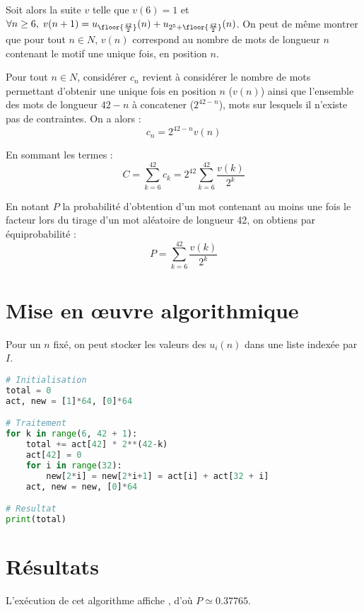 \documentclass{hibiscus}
\begin{document}
\par \medskip Soit alors la suite $v$ telle que $v(6) = 1$ et $\forall n \geq 6, \; v(n+1) = u_{\floor{\frac{42}{2}}}(n) + u_{2^5 + \floor{\frac{42}{2}}}(n)$. On peut de même montrer que pour tout $n \in N$, $v(n)$ correspond au nombre de mots de longueur $n$ contenant le motif  une unique fois, en position $n$. 

\par \medskip Pour tout $n \in N$, considérer $c_n$ revient à considérer le nombre de mots permettant d'obtenir  une unique fois en position $n$ ($v(n)$) ainsi que l'ensemble des mots de longueur $42 - n$ à concatener ($2^{42 - n}$), mots sur lesquels il n'existe pas de contraintes. On a alors : $$ c_n = 2^{42 - n} v(n) $$

\par \medskip En sommant les termes : $$ C = \sum_{k = 6}^{42}{c_k} = 2^{42} \sum_{k = 6}^{42}{\frac{v(k)}{2^k}} $$

\par \medskip En notant $P$ la probabilité d'obtention d'un mot contenant au moins une fois le facteur  lors du tirage d'un mot aléatoire de longueur 42, on obtiens par équiprobabilité : $$ P = \sum_{k = 6}^{42}{\frac{v(k)}{2^k}} $$

\section{Mise en \oe uvre algorithmique}

Pour un $n$ fixé, on peut stocker les valeurs des $u_i(n)$ dans une liste indexée par $I$.

\begin{lstlisting}[language=Python, caption=Dénombrement des cas favorables]
# Initialisation
total = 0
act, new = [1]*64, [0]*64

# Traitement
for k in range(6, 42 + 1):
    total += act[42] * 2**(42-k)
    act[42] = 0
    for i in range(32):
        new[2*i] = new[2*i+1] = act[i] + act[32 + i]
    act, new = new, [0]*64

# Resultat
print(total)
\end{lstlisting}

\section{Résultats}

\par \medskip L'exécution de cet algorithme affiche , d'où $P \simeq 0.37765$.
\end{document}
